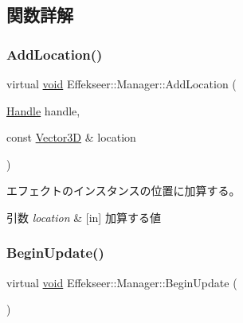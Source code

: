 \subsection{関数詳解}
\mbox{\label{class_effekseer_1_1_manager_a8f391814f681fc7acc4e8ed785c80cbc}} 
\subsubsection{\texorpdfstring{Add\+Location()}{AddLocation()}}
{\footnotesize\ttfamily virtual \mbox{\hyperlink{namespace_effekseer_ab34c4088e512200cf4c2716f168deb56}{void}} Effekseer\+::\+Manager\+::\+Add\+Location (\begin{DoxyParamCaption}\item[{\mbox{\hyperlink{namespace_effekseer_afba58b8d812da862190e9bbfc040824a}{Handle}}}]{handle,  }\item[{const \mbox{\hyperlink{struct_effekseer_1_1_vector3_d}{Vector3D}} \&}]{location }\end{DoxyParamCaption})\hspace{0.3cm}{\ttfamily [pure virtual]}}



エフェクトのインスタンスの位置に加算する。 


\begin{DoxyParams}{引数}
{\em location} & \mbox{[}in\mbox{]} 加算する値 \\
\hline
\end{DoxyParams}
\mbox{\label{class_effekseer_1_1_manager_a8b9585b3bee11d4d0d7b29b742178f96}} 
\subsubsection{\texorpdfstring{Begin\+Update()}{BeginUpdate()}}
{\footnotesize\ttfamily virtual \mbox{\hyperlink{namespace_effekseer_ab34c4088e512200cf4c2716f168deb56}{void}} Effekseer\+::\+Manager\+::\+Begin\+Update (\begin{DoxyParamCaption}{ }\end{DoxyParamCaption})\hspace{0.3cm}{\ttfamily [pure virtual]}}



